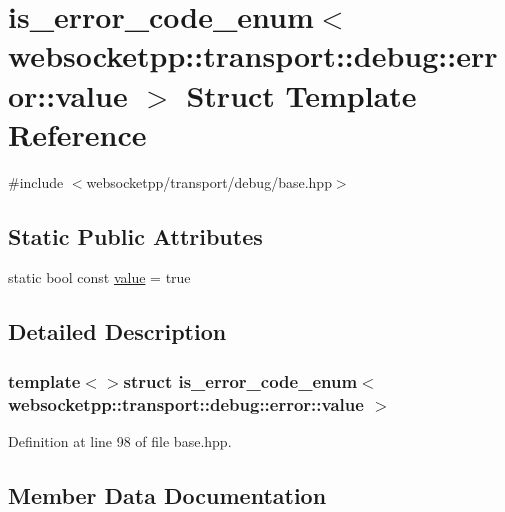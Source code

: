 \hypertarget{structis__error__code__enum_3_01websocketpp_1_1transport_1_1debug_1_1error_1_1value_01_4}{}\section{is\+\_\+error\+\_\+code\+\_\+enum$<$ websocketpp\+:\+:transport\+:\+:debug\+:\+:error\+:\+:value $>$ Struct Template Reference}
\label{structis__error__code__enum_3_01websocketpp_1_1transport_1_1debug_1_1error_1_1value_01_4}


{\ttfamily \#include $<$websocketpp/transport/debug/base.\+hpp$>$}

\subsection*{Static Public Attributes}
\begin{DoxyCompactItemize}
\item 
static bool const \hyperlink{structis__error__code__enum_3_01websocketpp_1_1transport_1_1debug_1_1error_1_1value_01_4_a9e78f2635c2c354c3e5b479cdcdc2f0b}{value} = true
\end{DoxyCompactItemize}


\subsection{Detailed Description}
\subsubsection*{template$<$$>$struct is\+\_\+error\+\_\+code\+\_\+enum$<$ websocketpp\+::transport\+::debug\+::error\+::value $>$}



Definition at line 98 of file base.\+hpp.



\subsection{Member Data Documentation}
\hypertarget{structis__error__code__enum_3_01websocketpp_1_1transport_1_1debug_1_1error_1_1value_01_4_a9e78f2635c2c354c3e5b479cdcdc2f0b}{}
